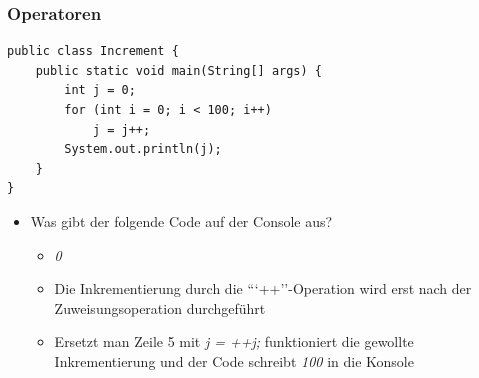\documentclass{beamer}
\begin{document}
\begin{frame}[fragile]
\frametitle{Operatoren}

\begin{lstlisting}
public class Increment {
	public static void main(String[] args) {
		int j = 0;
		for (int i = 0; i < 100; i++)
			j = j++;
		System.out.println(j);
	}
}
\end{lstlisting}

\begin{itemize}
\item Was gibt der folgende Code auf der Console aus?
	\begin{itemize}
	\item \textit{0}
	\item Die Inkrementierung durch die ```++''-Operation wird erst nach der Zuweisungsoperation durchgef\"uhrt
	\item Ersetzt man Zeile 5 mit \textit{j = ++j;} funktioniert die gewollte Inkrementierung und der Code schreibt \textit{100} in die Konsole
	\end{itemize}
\end{itemize}

\end{frame}
\end{document}
